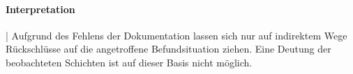 \paragraph{Interpretation}\hspace{-.5em}|\hspace{.5em}%
Aufgrund des Fehlens der Dokumentation lassen sich nur auf indirektem Wege Rückschlüsse auf die angetroffene Befundsituation ziehen. Eine Deutung der beobachteten Schichten ist auf dieser Basis nicht möglich.